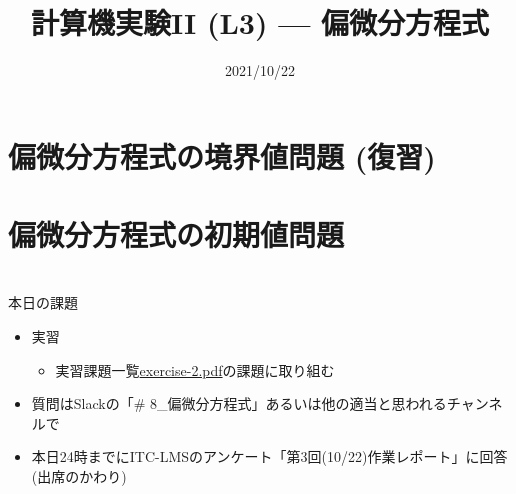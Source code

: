 \documentclass[10pt,dvipdfmx]{beamer}
\title{計算機実験II (L3) --- 偏微分方程式}
\date{2021/10/22}
\begin{document}
\begin{frame}
  \titlepage
  \tableofcontents
\end{frame}



\section{偏微分方程式の境界値問題 (復習)}





\section{偏微分方程式の初期値問題}













\section{}
\begin{frame}[t]{本日の課題}
  \begin{itemize}
  \item 実習
    \begin{itemize}
    \item 実習課題一覧\href{https://github.com/todo-group/ComputerExperiments/releases/tag/2021a-computer2}{exercise-2.pdf}の課題に取り組む
    \end{itemize}
  \item 質問はSlackの「\# 8\_偏微分方程式」あるいは他の適当と思われるチャンネルで
  \item 本日24時までにITC-LMSのアンケート「第3回(10/22)作業レポート」に回答(出席のかわり)
  \end{itemize}
\end{frame}
\end{document}
